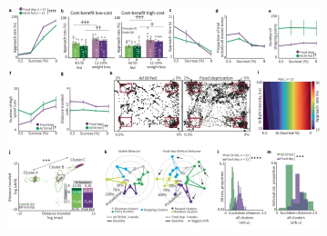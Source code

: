 \documentclass{article}
\begin{document}
\begin{figure}
  \centering
  \includegraphics[width=\textwidth]{Figs/Record_main_3.pdf}
\end{figure}

\clearpage
\end{document}
